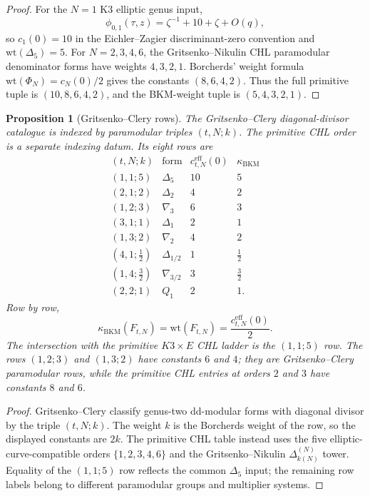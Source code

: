 \documentclass[11pt]{amsart}
\newtheorem{proposition}[theorem]{Proposition}
\theoremstyle{definition}
\theoremstyle{remark}
\providecommand{\kBKM}{\kappa_{\mathrm{BKM}}}
\providecommand{\wt}{\mathrm{wt}}
\begin{document}
\begin{proof}
For the \(N=1\) K3 elliptic genus input,
\[
 \phi_{0,1}(\tau,z)=\zeta^{-1}+10+\zeta+O(q),
\]
so \(c_1(0)=10\) in the Eichler--Zagier discriminant-zero convention and
\(\wt(\Delta_5)=5\). For \(N=2,3,4,6\), the Gritsenko--Nikulin CHL
paramodular denominator forms have weights \(4,3,2,1\). Borcherds'
weight formula \(\wt(\Phi_N)=c_N(0)/2\) gives the constants
\((8,6,4,2)\). Thus the full primitive tuple is
\((10,8,6,4,2)\), and the BKM-weight tuple is
\((5,4,3,2,1)\).
\end{proof}

\begin{proposition}[Gritsenko--Clery rows]
\label{prop:gritsenko-clery-row-separation}
The Gritsenko--Clery diagonal-divisor catalogue is indexed by
paramodular triples \((t,N;k)\). The primitive CHL order is a separate
indexing datum.
Its eight rows are
\[
\begin{array}{c|c|c|c}
(t,N;k) & \text{form} & c^{\mathrm{eff}}_{t,N}(0) & \kBKM\\
\hline
(1,1;5) & \Delta_5 & 10 & 5\\
(2,1;2) & \Delta_2 & 4 & 2\\
(1,2;3) & \nabla_3 & 6 & 3\\
(3,1;1) & \Delta_1 & 2 & 1\\
(1,3;2) & \nabla_2 & 4 & 2\\
(4,1;\tfrac12) & \Delta_{1/2} & 1 & \tfrac12\\
(1,4;\tfrac32) & \nabla_{3/2} & 3 & \tfrac32\\
(2,2;1) & Q_1 & 2 & 1 .
\end{array}
\]
Row by row,
\[
 \kBKM(F_{t,N})=\wt(F_{t,N})
 =\frac{c^{\mathrm{eff}}_{t,N}(0)}2 .
\]
The intersection with the primitive \(K3\times E\) CHL ladder is the
\((1,1;5)\) row. The rows \((1,2;3)\) and \((1,3;2)\) have constants
\(6\) and \(4\); they are Gritsenko--Clery paramodular rows, while the
primitive CHL entries at orders \(2\) and \(3\) have constants \(8\) and
\(6\).
\end{proposition}

\begin{proof}
Gritsenko--Clery classify genus-two dd-modular forms with diagonal
divisor by the triple \((t,N;k)\). The weight \(k\) is the Borcherds
weight of the row, so the displayed constants are \(2k\). The primitive
CHL table instead uses the five elliptic-curve-compatible orders
\(\{1,2,3,4,6\}\) and the Gritsenko--Nikulin \(\Delta_{k(N)}^{(N)}\)
tower. Equality of the \((1,1;5)\) row reflects the common
\(\Delta_5\) input; the remaining row labels belong to different
paramodular groups and multiplier systems.
\end{proof}
\end{document}
